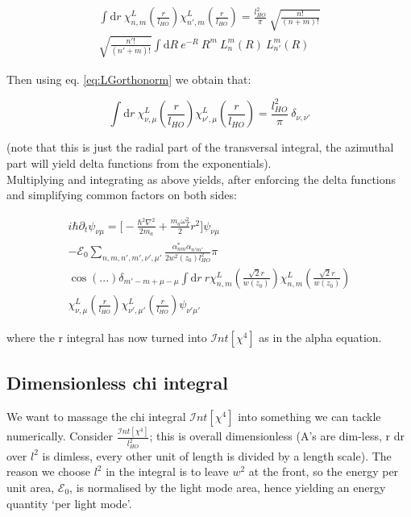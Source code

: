 \documentclass[a4paper,twocolumn,nobalancelastpage]{revtex4-1}
\newcommand{\lho}{l_{HO}}
\newcommand{\wzsq}{w^2(z_0)}
\newcommand{\lf}{\alpha_{nm}}
\newcommand{\lfp}{\alpha_{n'm'}}
\newcommand{\chiaf}{\chi_{\nu,\mu}^L\left(\frac{r}{\lho}\right)}
\newcommand{\chiafp}{\chi_{\nu',\mu'}^L\left(\frac{r}{\lho}\right)}
\newcommand{\chilf}{\chi_{n,m}^L\left(\frac{\sqrt{2}r}{w(z_0)}\right)}
\newcommand{\chilfp}{\chi_{n,m}^L\left(\frac{\sqrt{2}r}{w(z_0)}\right)}
\newcommand{\intfour}{\mathcal{I}nt[\chi^4]}
\begin{document}
\begin{multline}
\int \mathrm{d}r \ \chi_{n,m}^L\left(\frac{r}{\lho}\right) \chi_{n',m}^L\left(\frac{r}{\lho}\right) = \frac{\lho^2}{\pi} \ \sqrt{\frac{n!}{(n+m)!}}\\ \sqrt{\frac{n'!}{(n'+m)!}} \int \mathrm{d}R \ e^{-R} \ R^m \ L^m_n(R) \ L^m_{n'}(R) 
\end{multline}

Then using eq. \eqref{eq:LGorthonorm} we obtain that:

\begin{equation}
\label{eq:Chiorthonorm}
\int \mathrm{d}r \ \chiaf \chi_{\nu',\mu}^L\left(\frac{r}{\lho}\right) = \frac{\lho^2}{\pi} \  \delta_{\nu,\nu'}
\end{equation}

(note that this is just the radial part of the transversal integral, the azimuthal part will yield delta functions from the exponentials).
\\
Multiplying and integrating as above yields, after enforcing the delta functions and simplifying common factors on both sides:

\begin{multline}
i\hbar \partial_t \psi_{\nu \mu}= \bigg[ -\frac{\hbar^2 \nabla^2}{2m_a}+ \frac{m_a \omega_T^2}{2}r^2 \bigg] \psi_{\nu \mu}
\\ - \mathcal{E}_0 \sum_{n,m,n',m', \nu', \mu'} \frac{\lf^* \lfp}{2 \wzsq \lho^2} \pi \\ \cos(...) \delta_{m'-m+\mu-\mu} 
\int \mathrm{d}r \ r \chilf \chilfp \\ \chiaf \chiafp  \psi_{\nu' \mu'}
\end{multline}

where the r integral has now turned into $\intfour$ as in the alpha equation.

\subsection{Dimensionless chi integral}

We want to massage the chi integral $\intfour$ into something we can tackle numerically.
Consider $\frac{\intfour}{\lho^2}$; this is overall dimensionless (A's are dim-less, r dr over $l^2$ is dimless, every other unit of length is divided by a length scale). The reason we choose $l^2$ in the integral is to leave $w^2$ at the front, so the energy per unit area, $\mathcal{E}_0 $, is normalised by the light mode area, hence yielding an energy quantity `per light mode'.
\end{document}
